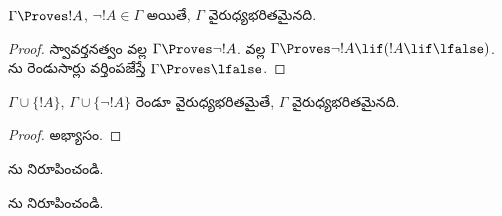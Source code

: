 \documentclass[../../../include/open-logic-section]{subfiles}
\begin{document}
\begin{prop}
  $\Gamma \Proves !A$, $\lnot !A \in \Gamma$ అయితే, $\Gamma$
  వైరుధ్యభరితమైనది.
\end{prop}

\begin{proof}
  స్వావర్తనత్వం వల్ల $\Gamma \Proves \lnot !A$.
   వల్ల $\Gamma \Proves \lnot !A \lif
  (!A \lif \lfalse)$. ను రెండుసార్లు
  వర్తింపజేస్తే $\Gamma \Proves \lfalse$.
\end{proof}


\begin{prop}
  $\Gamma \cup \{!A\}$, $\Gamma \cup \{\lnot !A\}$ రెండూ
  వైరుధ్యభరితమైతే, $\Gamma$ వైరుధ్యభరితమైనది.
\end{prop}

\begin{proof}
అభ్యాసం.
\end{proof}

\begin{prob}
  ను నిరూపించండి.
\end{prob}
\tagendprob

\begin{prob}
  ను నిరూపించండి.
\end{prob}
\tagendprob
\end{document}

